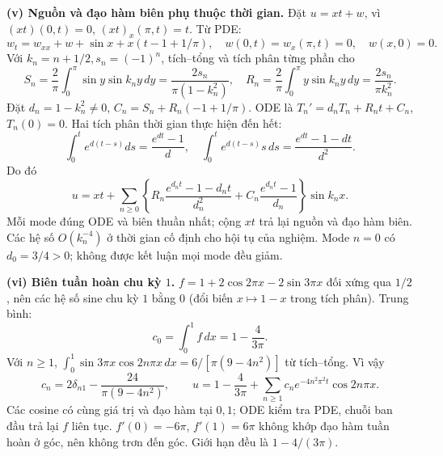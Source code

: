 \documentclass[10pt,a4paper]{article}
\begin{document}
\textbf{(v) Nguồn và đạo hàm biên phụ thuộc thời gian.}
Đặt $u=xt+w$, vì $(xt)(0,t)=0$, $(xt)_x(\pi,t)=t$. Từ PDE:
\[w_t=w_{xx}+w+\sin x+x(t-1+1/\pi),\quad
w(0,t)=w_x(\pi,t)=0,\quad w(x,0)=0.\]
Với $k_n=n+1/2,s_n=(-1)^n$, tích–tổng và tích phân từng phần cho
\[S_n=\frac2\pi\int_0^\pi\sin y\sin k_ny\,dy
=\frac{2s_n}{\pi(1-k_n^2)},\quad
R_n=\frac2\pi\int_0^\pi y\sin k_ny\,dy=\frac{2s_n}{\pi k_n^2}.\]
Đặt $d_n=1-k_n^2\ne0$, $C_n=S_n+R_n(-1+1/\pi)$. ODE là $T_n'=d_nT_n+R_nt+C_n$, $T_n(0)=0$. Hai tích phân thời gian thực hiện đến hết:
\[\int_0^te^{d(t-s)}ds=\frac{e^{dt}-1}d,\quad
\int_0^te^{d(t-s)}s\,ds=\frac{e^{dt}-1-dt}{d^2}.\]
Do đó
\[u=xt+\sum_{n\ge0}\left\{
R_n\frac{e^{d_nt}-1-d_nt}{d_n^2}
+C_n\frac{e^{d_nt}-1}{d_n}\right\}\sin k_nx.\]
Mỗi mode đúng ODE và biên thuần nhất; cộng $xt$ trả lại nguồn và đạo hàm biên. Các hệ số $O(k_n^{-4})$ ở thời gian cố định cho hội tụ của nghiệm. Mode $n=0$ có $d_0=3/4>0$; không được kết luận mọi mode đều giảm.

\textbf{(vi) Biên tuần hoàn chu kỳ $1$.}
$f=1+2\cos2\pi x-2\sin3\pi x$ đối xứng qua $1/2$, nên các hệ số sine chu kỳ $1$ bằng $0$ (đổi biến $x\mapsto1-x$ trong tích phân). Trung bình:
\[c_0=\int_0^1f\,dx=1-\frac4{3\pi}.\]
Với $n\ge1$, $\int_0^1\sin3\pi x\cos2n\pi x\,dx=6/[\pi(9-4n^2)]$ từ tích–tổng. Vì vậy
\[c_n=2\delta_{n1}-\frac{24}{\pi(9-4n^2)},\qquad
u=1-\frac4{3\pi}+\sum_{n\ge1}c_ne^{-4n^2\pi^2t}\cos2n\pi x.\]
Các cosine có cùng giá trị và đạo hàm tại $0,1$; ODE kiểm tra PDE, chuỗi ban đầu trả lại $f$ liên tục. $f'(0)=-6\pi$, $f'(1)=6\pi$ không khớp đạo hàm tuần hoàn ở góc, nên không trơn đến góc. Giới hạn đều là $1-4/(3\pi)$.
\end{document}
